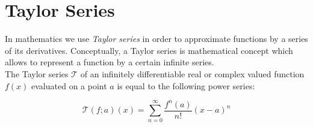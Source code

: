 \section{Taylor Series}
In mathematics we use \emph{Taylor series} in order to approximate functions by a series of its derivatives. Conceptually, a Taylor series is mathematical concept which allows to represent a function by a certain infinite series.  \\

The Taylor series $\mathcal T$ of an infinitely differentiable real or complex valued function $f(x)$ evaluated on a point $a$ is equal to the following power series:

\begin{equation}
  \mathcal T(f;a)(x) = \sum_{n=0}^{\infty} \frac{f^{n}(a)}{n!}(x-a)^n
  \label{eq:deftaylor}
\end{equation}